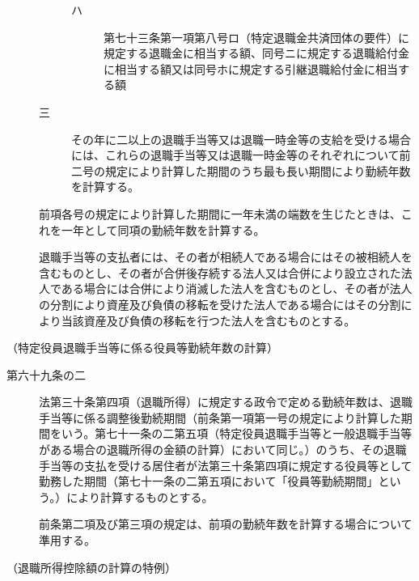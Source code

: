 \documentclass[twocolumn,a4j,10pt]{ltjtarticle}
\begin{document}
\begin{description}
\begin{description}
\begin{description}
\item[ハ]第七十三条第一項第八号ロ（特定退職金共済団体の要件）に規定する退職金に相当する額、同号ニに規定する退職給付金に相当する額又は同号ホに規定する引継退職給付金に相当する額
\end{description}
\item[三]その年に二以上の退職手当等又は退職一時金等の支給を受ける場合には、これらの退職手当等又は退職一時金等のそれぞれについて前二号の規定により計算した期間のうち最も長い期間により勤続年数を計算する。
\end{description}
\item[\rensuji{2}]前項各号の規定により計算した期間に一年未満の端数を生じたときは、これを一年として同項の勤続年数を計算する。
\item[\rensuji{3}]退職手当等の支払者には、その者が相続人である場合にはその被相続人を含むものとし、その者が合併後存続する法人又は合併により設立された法人である場合には合併により消滅した法人を含むものとし、その者が法人の分割により資産及び負債の移転を受けた法人である場合にはその分割により当該資産及び負債の移転を行つた法人を含むものとする。
\end{description}
\noindent\hspace{10pt}（特定役員退職手当等に係る役員等勤続年数の計算）
\begin{description}
\item[第六十九条の二]法第三十条第四項（退職所得）に規定する政令で定める勤続年数は、退職手当等に係る調整後勤続期間（前条第一項第一号の規定により計算した期間をいう。第七十一条の二第五項（特定役員退職手当等と一般退職手当等がある場合の退職所得の金額の計算）において同じ。）のうち、その退職手当等の支払を受ける居住者が法第三十条第四項に規定する役員等として勤務した期間（第七十一条の二第五項において「役員等勤続期間」という。）により計算するものとする。
\item[]前条第二項及び第三項の規定は、前項の勤続年数を計算する場合について準用する。
\end{description}
\noindent\hspace{10pt}（退職所得控除額の計算の特例）
\end{document}
